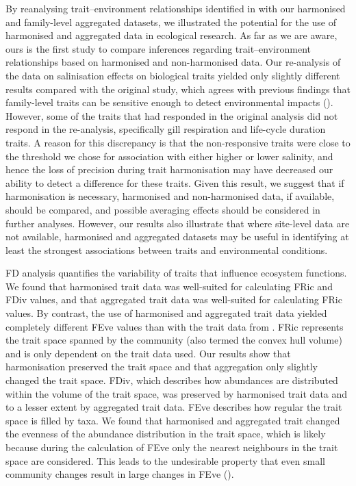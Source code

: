 \documentclass[12pt]{article}
\begin{document}
By reanalysing trait–environment relationships identified in \citet{szocs_effects_2014} with our harmonised and family-level aggregated datasets, we illustrated the potential for the use of harmonised and aggregated data in ecological research. As far as we are aware, ours is the first study to compare inferences regarding trait–environment relationships based on harmonised and non-harmonised data. Our re-analysis of the data on salinisation effects on biological traits yielded only slightly different results compared with the original study, which agrees with previous findings that family-level traits can be sensitive enough to detect environmental impacts (\cite{beketov_spear_2009}). However, some of the traits that had responded in the original analysis did not respond in the re-analysis, specifically gill respiration and life-cycle duration traits. A reason for this discrepancy is that the non-responsive traits were close to the threshold we chose for association with either higher or lower salinity, and hence the loss of precision during trait harmonisation may have decreased our ability to detect a difference for these traits. Given this result, we suggest that if harmonisation is necessary, harmonised and non-harmonised data, if available, should be compared, and possible averaging effects should be considered in further analyses. However, our results also illustrate that where site-level data are not available, harmonised and aggregated datasets may be useful in identifying at least the strongest associations between traits and environmental conditions. 

FD analysis quantifies the variability of traits that influence ecosystem functions. We found that harmonised trait data was well-suited for calculating FRic and FDiv values, and that aggregated trait data was well-suited for calculating FRic values. By contrast, the use of harmonised and aggregated trait data yielded completely different FEve values than with the trait data from \citet{szocs_effects_2014}. FRic represents the trait space spanned by the community (also termed the convex hull volume) and is only dependent on the trait data used. Our results show that harmonisation preserved the trait space and that aggregation only slightly changed the trait space. FDiv, which describes how abundances are distributed within the volume of the trait space, was preserved by harmonised trait data and to a lesser extent by aggregated trait data. FEve describes how regular the trait space is filled by taxa. We found that harmonised and aggregated trait changed the evenness of the abundance distribution in the trait space, which is likely because during the calculation of FEve only the nearest neighbours in the trait space are considered. This leads to the undesirable property that even small community changes result in large changes in FEve (\cite{botta-dukatTestingAbilityFunctional2016}).   
 
\end{document}
